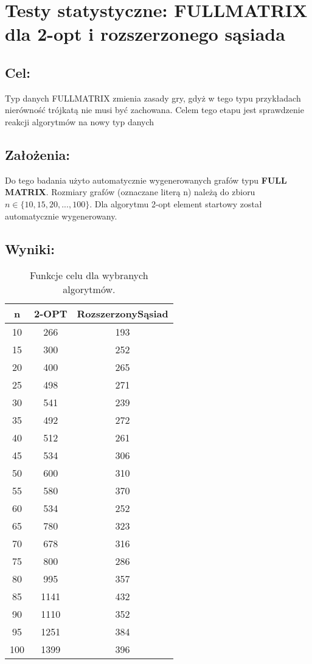 \section{Testy statystyczne: FULLMATRIX dla 2-opt i rozszerzonego sąsiada}
  \subsection{Cel:}
  Typ danych FULLMATRIX zmienia zasady gry, gdyż w tego typu przykładach nierówność trójkatą nie musi być zachowana. Celem tego etapu jest sprawdzenie reakcji algorytmów na nowy typ danych
  \subsection{Założenia:}
  Do tego badania użyto automatycznie wygenerowanych grafów typu \textbf{FULL MATRIX}. Rozmiary grafów (oznaczane literą n) należą do zbioru $n \in \{10,15,20,...,100\}$. Dla algorytmu 2-opt element startowy został automatycznie wygenerowany.
  \subsection{Wyniki: }
  \begin{table}[H]
    \begin{tabular}{|c | c | c |} 
     \hline
     n & 2-OPT & RozszerzonySąsiad \\ [0.5ex] 
     \hline\hline
    10 & 266 & 193 \\
    15 & 300 & 252 \\
    20 & 400 & 265 \\
    25 & 498 & 271 \\
    30 & 541 & 239 \\
    35 & 492 & 272 \\
    40 & 512 & 261 \\
    45 & 534 & 306 \\
    50 & 600 & 310 \\
    55 & 580 & 370 \\
    60 & 534 & 252 \\
    65 & 780 & 323 \\
    70 & 678 & 316 \\
    75 & 800 & 286 \\
    80 & 995 & 357 \\
    85 & 1141 & 432 \\ 
    90 & 1110 & 352 \\
    95 & 1251 & 384 \\ 
    100 & 1399 & 396 \\

     \hline
    \end{tabular}
    \caption{Funkcje celu dla wybranych algorytmów.}
    \end{table}
